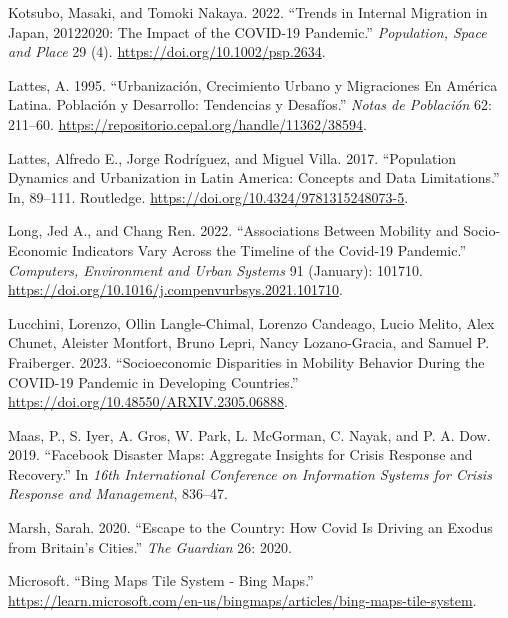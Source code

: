\documentclass[
  11pt,
]{article}
\newlength{\cslhangindent}
\newlength{\cslentryspacingunit} %
\newenvironment{CSLReferences}[2] %
 {%
  \setlength{\parindent}{0pt}
  \ifodd #1
  \let\oldpar\par
  \def\par{\hangindent=\cslhangindent\oldpar}
  \fi
  \setlength{\parskip}{#2\cslentryspacingunit}
 }%
 {}
\begin{document}
\begin{CSLReferences}{1}{0}
\leavevmode{}%
Kotsubo, Masaki, and Tomoki Nakaya. 2022. {``Trends in Internal
Migration in Japan, 2012{\textendash}2020: The Impact of the COVID{-}19
Pandemic.''} \emph{Population, Space and Place} 29 (4).
\url{https://doi.org/10.1002/psp.2634}.

\leavevmode{}%
Lattes, A. 1995. {``Urbanización, Crecimiento Urbano y Migraciones En
América Latina. Población y Desarrollo: Tendencias y Desafíos.''}
\emph{Notas de Población} 62: 211--60.
\url{https://repositorio.cepal.org/handle/11362/38594}.

\leavevmode{}%
Lattes, Alfredo E., Jorge Rodríguez, and Miguel Villa. 2017.
{``Population Dynamics and Urbanization in Latin America: Concepts and
Data Limitations.''} In, 89--111. Routledge.
\url{https://doi.org/10.4324/9781315248073-5}.

\leavevmode{}%
Long, Jed A., and Chang Ren. 2022. {``Associations Between Mobility and
Socio-Economic Indicators Vary Across the Timeline of the Covid-19
Pandemic.''} \emph{Computers, Environment and Urban Systems} 91
(January): 101710.
\url{https://doi.org/10.1016/j.compenvurbsys.2021.101710}.

\leavevmode{}%
Lucchini, Lorenzo, Ollin Langle-Chimal, Lorenzo Candeago, Lucio Melito,
Alex Chunet, Aleister Montfort, Bruno Lepri, Nancy Lozano-Gracia, and
Samuel P. Fraiberger. 2023. {``Socioeconomic Disparities in Mobility
Behavior During the COVID-19 Pandemic in Developing Countries.''}
\url{https://doi.org/10.48550/ARXIV.2305.06888}.

\leavevmode{}%
Maas, P., S. Iyer, A. Gros, W. Park, L. McGorman, C. Nayak, and P. A.
Dow. 2019. {``Facebook Disaster Maps: Aggregate Insights for Crisis
Response and Recovery.''} In \emph{16th International Conference on
Information Systems for Crisis Response and Management}, 836--47.

\leavevmode{}%
Marsh, Sarah. 2020. {``Escape to the Country: How Covid Is Driving an
Exodus from Britain's Cities.''} \emph{The Guardian} 26: 2020.

\leavevmode{}%
Microsoft. {``{B}ing {M}aps {T}ile {S}ystem - {B}ing {M}aps.''}
\url{https://learn.microsoft.com/en-us/bingmaps/articles/bing-maps-tile-system}.


\end{CSLReferences}
\end{document}
